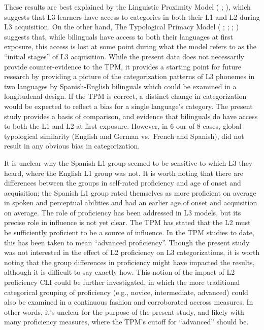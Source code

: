 \documentclass[preprints]{Definitions/mdpi}
\begin{document}
These results are best explained by the Linguistic Proximity Model (\citeauthor{westergaard_crosslinguistic_2017} \citeyear{westergaard_crosslinguistic_2017};
\citeauthor{westergaard_microvariation_2021} \citeyear{westergaard_microvariation_2021}), which suggests that L3 learners have access to categories in both their L1 and L2 during L3 acquisition.
On the other hand, The Typological Primacy Model (\citeauthor{rothman_typological_2010} \citeyear{rothman_typological_2010};
\citeauthor{rothman_l3_2011} \citeyear{rothman_l3_2011};
\citeauthor{baauw_cognitive_2013} \citeyear{baauw_cognitive_2013};
\citeauthor{rothman_linguistic_2015} \citeyear{rothman_linguistic_2015}) suggests that, while bilinguals have access to both their languages at first exposure, this access is lost at some point during what the model refers to as the ``initial stages'' of L3 acquisition.
While the present data does not necessarily provide counter-evidence to the TPM, it provides a starting point for future research by providing a picture of the categorization patterns of L3 phonemes in two languages by Spanish-English bilinguals which could be examined in a longitudenal design. If the TPM is correct, a distinct change in categorization would be expected to reflect a bias for a single language's category.
The present study provides a basis of comparison, and evidence that bilinguals do have access to both the L1 and L2 at first exposure.
However, in 6 our of 8 cases, global typological similarity (English and German vs.~French and Spanish), did not result in any obvious bias in categorization.

It is unclear why the Spanish L1 group seemed to be sensitive to which L3 they heard, where the English L1 group was not.
It is worth noting that there are differences between the groups in self-rated proficiency and age of onset and acquisition; the Spanish L1 group rated themselves as more proficient on average in spoken and perceptual abilities and had an earlier age of onset and acquisition on average.
The role of proficiency has been addressed in L3 models, but its precise role in influence is not yet clear.
The TPM has stated that the L2 must be sufficiently proficient to be a source of influence.
In the TPM studies to date, this has been taken to mean ``advanced proficiency''.
Though the present study was not interested in the effect of L2 proficiency on L3 categorizations, it is worth noting that the group differences in proficiency might have impacted the results, although it is difficult to say exactly how.
This notion of the impact of L2 proficiency CLI could be further investigated, in which the more traditional categorical grouping of proficiency (e.g., novice, intermediate, advanced) could also be examined in a continuous fashion and corroborated accross measures.
In other words, it's unclear for the purpose of the present study, and likely with many proficiency measures, where the TPM's cutoff for ``advanced'' should be.
\end{document}
